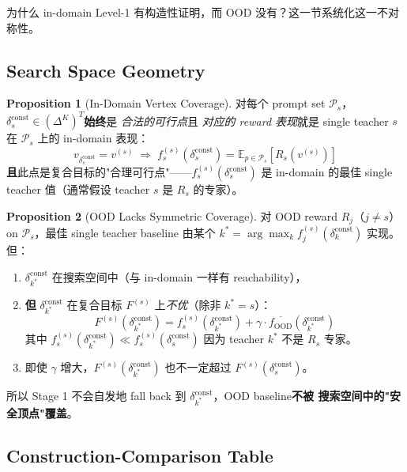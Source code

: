 \documentclass[11pt,a4paper]{article}
\newcommand{\E}{\mathbb{E}}
\newcommand{\OOD}{\mathrm{OOD}}
\newcommand{\const}{\mathrm{const}}
\theoremstyle{definition}
\newtheorem{proposition}{Proposition}
\begin{document}
为什么 in-domain Level-1 有构造性证明，而 OOD 没有？这一节系统化这一不对称性。

\subsection{Search Space Geometry}

\begin{proposition}[In-Domain Vertex Coverage]
\label{prop:in_domain_coverage}
对每个 prompt set $\mathcal{P}_s$，
$\delta_s^\const \in (\Delta^K)^T$\textbf{始终}是 \emph{合法的可行点}且
\emph{对应的 reward 表现}就是 single teacher $s$ 在 $\mathcal{P}_s$ 上的
in-domain 表现：
\begin{equation}
v_{\delta_s^\const} = v^{(s)} \;\Rightarrow\; f_s^{(s)}(\delta_s^\const) = \E_{p \in \mathcal{P}_s}[R_s(v^{(s)})]
\end{equation}
\textbf{且}此点是复合目标的"合理可行点"——$f_s^{(s)}(\delta_s^\const)$ 是
in-domain 的最佳 single teacher 值（通常假设 teacher $s$ 是 $R_s$ 的专家）。
\end{proposition}

\begin{proposition}[OOD Lacks Symmetric Coverage]
\label{prop:ood_no_coverage}
对 OOD reward $R_j$（$j \neq s$）on $\mathcal{P}_s$，最佳 single teacher
baseline 由某个 $k^* = \arg\max_k f_j^{(s)}(\delta_k^\const)$ 实现。但：
\begin{enumerate}[leftmargin=1.5em]
\item $\delta_{k^*}^\const$ 在搜索空间中（与 in-domain 一样有 reachability），
\item \textbf{但} $\delta_{k^*}^\const$ 在复合目标 $F^{(s)}$ 上\emph{不优}（除非 $k^* = s$）：
\begin{equation}
F^{(s)}(\delta_{k^*}^\const) = f_s^{(s)}(\delta_{k^*}^\const) + \gamma \cdot \overline{f_{\OOD}}(\delta_{k^*}^\const)
\end{equation}
其中 $f_s^{(s)}(\delta_{k^*}^\const) \ll f_s^{(s)}(\delta_s^\const)$ 因为
teacher $k^*$ 不是 $R_s$ 专家。
\item 即使 $\gamma$ 增大，$F^{(s)}(\delta_{k^*}^\const)$ 也不一定超过
$F^{(s)}(\delta_s^\const)$。
\end{enumerate}
所以 Stage 1 不会自发地 fall back 到 $\delta_{k^*}^\const$，OOD baseline\textbf{不被
搜索空间中的"安全顶点"覆盖}。
\end{proposition}

\subsection{Construction-Comparison Table}
\end{document}
